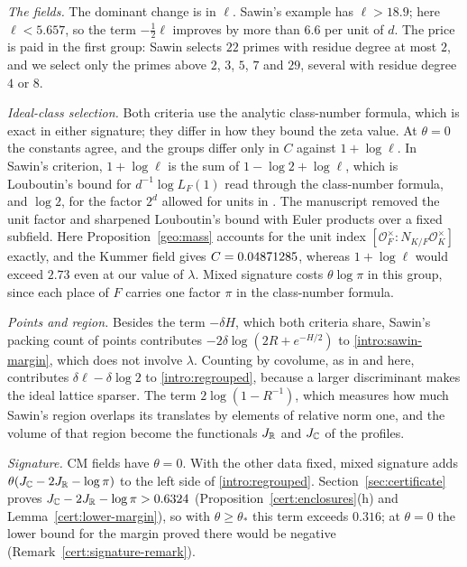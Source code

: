 \emph{The fields.} The dominant change is in $\ell$. Sawin's example has
$\ell>18.9$; here $\ell<5.657$, so the term $-\frac12\ell$ improves by
more than $6.6$ per unit of $d$. The price is paid in the first group:
Sawin selects $22$ primes with residue degree at most $2$, and we select
only the primes above $2$, $3$, $5$, $7$ and $29$, several with residue
degree $4$ or $8$.

\emph{Ideal-class selection.} Both criteria use the analytic class-number
formula, which is exact in either signature; they differ in how they
bound the zeta value. At $\theta=0$ the constants agree, and the groups
differ only in $C$ against $1+\log\ell$. In Sawin's criterion,
$1+\log\ell$ is the sum of $1-\log2+\log\ell$, which is Louboutin's
bound \cite[Corollary~3]{Louboutin2000} for $d^{-1}\log L_F(1)$ read
through the class-number formula, and $\log2$, for the factor $2^d$
allowed for units in
\cite[Lemma~6]{Sawin2026}. The manuscript \cite{Naslund0358} removed the
unit factor and sharpened Louboutin's bound with Euler products over a
fixed subfield. Here Proposition~\ref{geo:mass} accounts for the unit
index $[\mathcal O_F^\times:N_{K/F}\mathcal O_K^\times]$ exactly, and the Kummer field gives $C=0.04871285$, whereas
$1+\log\ell$ would exceed $2.73$ even at our value of $\lambda$. Mixed
signature costs $\theta\log\pi$ in this group, since each place of $F$
carries one factor $\pi$ in the class-number formula.

\emph{Points and region.} Besides the term $-\delta H$, which both
criteria share, Sawin's packing count of points contributes
$-2\delta\log(2R+e^{-H/2})$ to \eqref{intro:sawin-margin}, which does not
involve $\lambda$. Counting by covolume, as in \cite{Naslund0358} and
here, contributes $\delta\ell-\delta\log2$ to \eqref{intro:regrouped},
because a larger discriminant makes the ideal lattice sparser. The term $2\log(1-R^{-1})$, which measures how much Sawin's
region overlaps its translates by elements of relative norm one, and
the volume of that region become the functionals $J_\mathbb R$ and $J_\mathbb C$ of
the profiles.

\emph{Signature.} CM fields have $\theta=0$. With the other data fixed,
mixed signature adds $\theta(J_\mathbb C-2J_\mathbb R-\log\pi)$ to the left side of
\eqref{intro:regrouped}. Section~\ref{sec:certificate} proves
$J_\mathbb C-2J_\mathbb R-\log\pi>0.6324$ (Proposition~\ref{cert:enclosures}(h) and
Lemma~\ref{cert:lower-margin}), so
with $\theta\ge\theta_*$ this term exceeds $0.316$; at $\theta=0$ the
lower bound for the margin proved there would be negative
(Remark~\ref{cert:signature-remark}).

